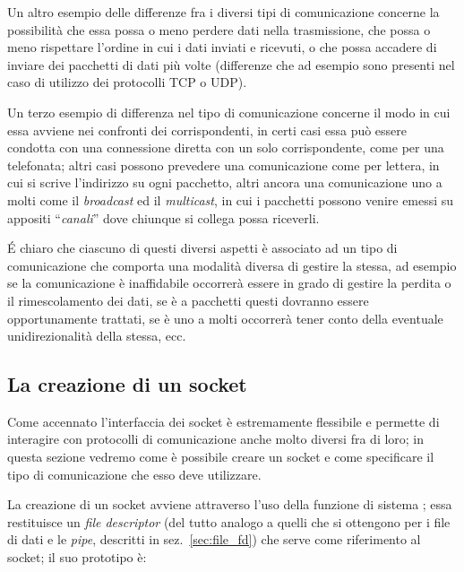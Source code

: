 Un altro esempio delle differenze fra i diversi tipi di comunicazione concerne
la possibilità che essa possa o meno perdere dati nella trasmissione, che
possa o meno rispettare l'ordine in cui i dati inviati e ricevuti, o che possa
accadere di inviare dei pacchetti di dati più volte (differenze che ad esempio
sono presenti nel caso di utilizzo dei protocolli TCP o UDP).

Un terzo esempio di differenza nel tipo di comunicazione concerne il modo in
cui essa avviene nei confronti dei corrispondenti, in certi casi essa può
essere condotta con una connessione diretta con un solo corrispondente, come
per una telefonata; altri casi possono prevedere una comunicazione come per
lettera, in cui si scrive l'indirizzo su ogni pacchetto, altri ancora una
comunicazione uno a molti come il \textit{broadcast} ed il \textit{multicast},
in cui i pacchetti possono venire emessi su appositi ``\textsl{canali}'' dove
chiunque si collega possa riceverli.

É chiaro che ciascuno di questi diversi aspetti è associato ad un tipo di
comunicazione che comporta una modalità diversa di gestire la stessa, ad
esempio se la comunicazione è inaffidabile occorrerà essere in grado di
gestire la perdita o il rimescolamento dei dati, se è a pacchetti questi
dovranno essere opportunamente trattati, se è uno a molti occorrerà tener
conto della eventuale unidirezionalità della stessa, ecc.



\subsection{La creazione di un socket}
\label{sec:sock_creation}

Come accennato l'interfaccia dei socket è estremamente flessibile e permette
di interagire con protocolli di comunicazione anche molto diversi fra di loro;
in questa sezione vedremo come è possibile creare un socket e come specificare
il tipo di comunicazione che esso deve utilizzare.

La creazione di un socket avviene attraverso l'uso della funzione di sistema 
; essa restituisce un \textit{file descriptor} (del tutto
analogo a quelli che si ottengono per i file di dati e le \textit{pipe},
descritti in sez.~\ref{sec:file_fd}) che serve come riferimento al socket; il
suo prototipo è:

